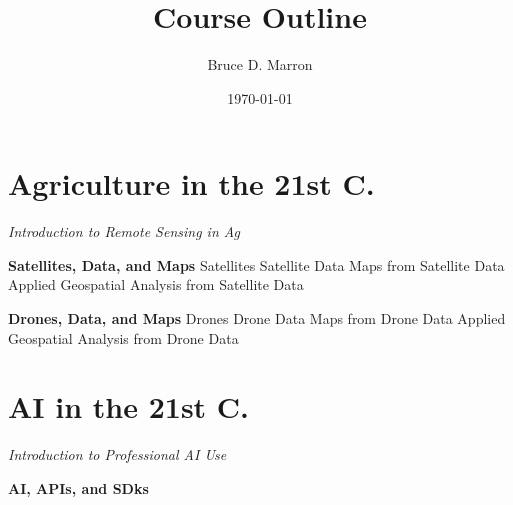 \documentclass[12pt, letterpaper]{article}
\title{\vspace{-15mm}\fontsize{14pt}{10pt}
                    \selectfont \textbf{Course Outline}   %
                    \vspace{-7mm}
      }
\author{
     \normalsize Bruce D. Marron \\                     %
     \vspace{-5mm}
}
\date{\normalsize \today}
\begin{document}
\begin{singlespacing}
\end{singlespacing}
\thispagestyle{fancy}                            %


\section{Agriculture in the 21st C.}

\large
\begin{flushleft}
\textit{Introduction to Remote Sensing in Ag}
\end{flushleft}
\normalsize

\begin{outline}[enumerate]

\1 \textbf{Satellites, Data, and Maps}
\2 Satellites
\3
\2 Satellite Data
\3 
\2 Maps from Satellite Data
\3
\2 Applied Geospatial Analysis from Satellite Data
\3

\1 \textbf{Drones, Data, and Maps}
\2 Drones
\3
\2 Drone Data
\3 
\2 Maps from Drone Data
\3
\2 Applied Geospatial Analysis from Drone Data
\end{outline}

\section{AI in the 21st C.}

\large
\begin{flushleft}
\textit{Introduction to Professional AI Use}
\end{flushleft}
\normalsize

\begin{outline}[enumerate]
\1 \textbf{AI, APIs, and SDks}

\end{outline}
\end{document}
